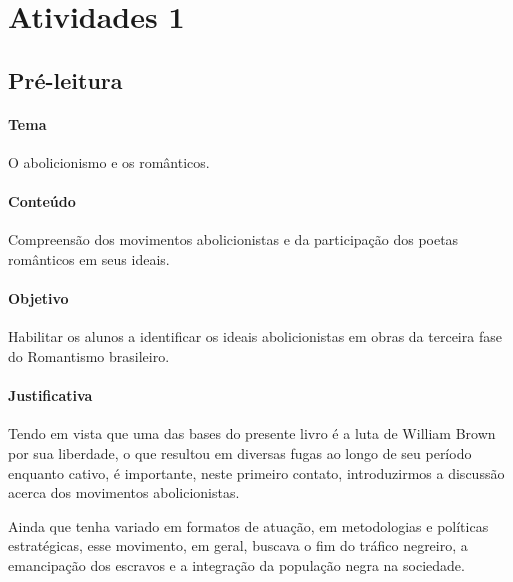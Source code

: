 \documentclass[11pt]{extarticle}
\begin{document}
\tableofcontents



\section{Atividades 1}


\subsection{Pré-leitura}


\paragraph{Tema} O abolicionismo e os românticos.

\paragraph{Conteúdo} Compreensão dos movimentos abolicionistas e da
participação dos poetas românticos em seus ideais.

\paragraph{Objetivo} Habilitar os alunos a identificar os ideais
abolicionistas em obras da terceira fase do Romantismo brasileiro.

\paragraph{Justificativa} Tendo em vista que uma das bases do presente
livro é a luta de William Brown por sua liberdade, o que resultou em diversas
fugas ao longo de seu período enquanto cativo, é importante, neste primeiro
contato, introduzirmos a discussão acerca dos movimentos abolicionistas.

Ainda que tenha variado em formatos de atuação, em
metodologias e políticas estratégicas, esse movimento, em geral, buscava
o fim do tráfico negreiro, a emancipação dos escravos e a integração da
população negra na sociedade. 
\end{document}
